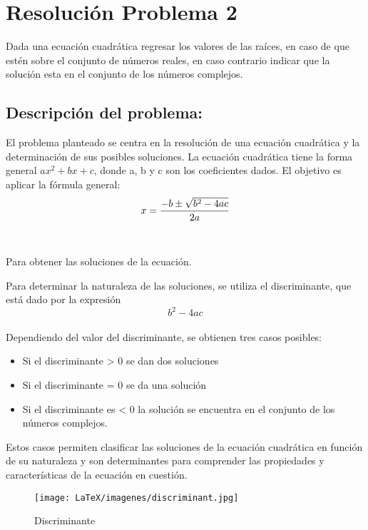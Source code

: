 \section{Resolución Problema 2} 
Dada una ecuación cuadrática regresar los valores de las raíces, en caso de que estén sobre el conjunto de números reales, en caso contrario indicar que la solución esta en el conjunto de los números complejos.


\subsection{\textbf{Descripción del problema:}}
El problema planteado se centra en la resolución de una ecuación cuadrática y la determinación de sus posibles soluciones. La ecuación cuadrática tiene la forma general $ax^{2}+bx+c$, donde a, b y c son los coeficientes dados. El objetivo es aplicar la fórmula general:
\begin{equation}
\\
\\ x = \frac{{-b \pm \sqrt{{b^2 - 4ac}}}}{{2a}} \\
\end{equation}
\\
\\Para obtener las soluciones de la ecuación.

Para determinar la naturaleza de las soluciones, se utiliza el discriminante, que está dado por la expresión 
\begin{equation}
 b^2 - 4ac 
\end{equation}
\\Dependiendo del valor del discriminante, se obtienen tres casos posibles:
\begin{itemize}
    \item Si el discriminante > 0 se dan dos soluciones
    \item Si el discriminante = 0 se da una solución
    \item Si el discriminante es < 0 la solución se encuentra en el conjunto de los números complejos. 
\end{itemize}
 Estos casos permiten clasificar las soluciones de la ecuación cuadrática en función de su naturaleza y son determinantes para comprender las propiedades y características de la ecuación en cuestión.


\begin{figure}[H]
    \centering
    \texttt{[image: LaTeX/imagenes/discriminant.jpg]}
    \caption{Discriminante}
    \label{fig:Discriminante}
\end{figure}


